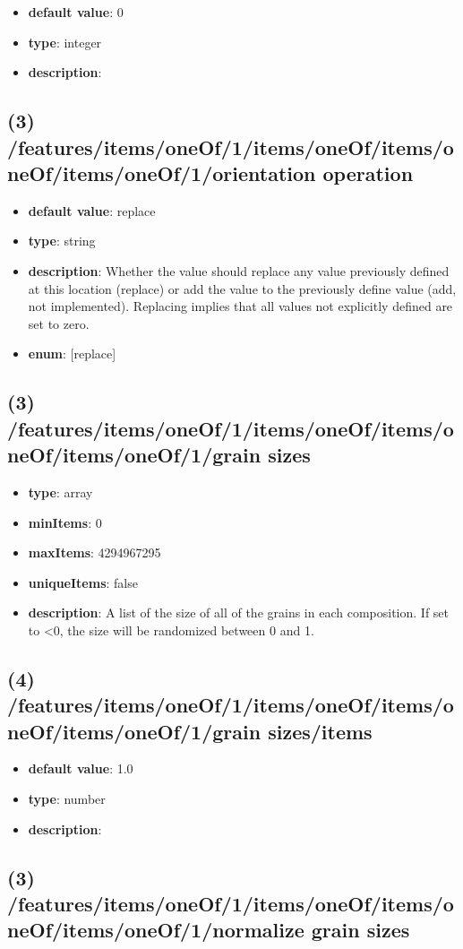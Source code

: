 \begin{itemize}[leftmargin=4em]\item {\bf default value}: 0
\item {\bf type}: integer
\item {\bf description}: 
\end{itemize}\subsection{(3) /features/items/oneOf/1/items/oneOf/items/oneOf/items/oneOf/1/orientation operation}
\begin{itemize}[leftmargin=3em]\item {\bf default value}: replace
\item {\bf type}: string
\item {\bf description}: Whether the value should replace any value previously defined at this location (replace) or add the value to the previously define value (add, not implemented). Replacing implies that all values not explicitly defined are set to zero.
\item {\bf enum}: [replace]\end{itemize}\subsection{(3) /features/items/oneOf/1/items/oneOf/items/oneOf/items/oneOf/1/grain sizes}
\begin{itemize}[leftmargin=3em]\item {\bf type}: array
\item {\bf minItems}: 0
\item {\bf maxItems}: 4294967295
\item {\bf uniqueItems}: false
\item {\bf description}: A list of the size of all of the grains in each composition. If set to <0, the size will be randomized between 0 and 1.
\end{itemize}\subsection{(4) /features/items/oneOf/1/items/oneOf/items/oneOf/items/oneOf/1/grain sizes/items}
\begin{itemize}[leftmargin=4em]\item {\bf default value}: 1.0
\item {\bf type}: number
\item {\bf description}: 
\end{itemize}\subsection{(3) /features/items/oneOf/1/items/oneOf/items/oneOf/items/oneOf/1/normalize grain sizes}
